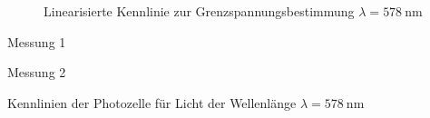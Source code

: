 \begin{figure}
	\centering
	
	\caption{Linearisierte Kennlinie zur Grenzspannungsbestimmung $\lambda = \SI{578}{\nano\metre}$}
	\label{fig:kennlinien_578nm}
\end{figure}
\begin{table}
	\centering
	\begin{subtable}{0.5\textwidth}
		\centering
		\vspace{0pt}
		\resizebox{0.95\columnwidth}{!}{%
			
		}
		\caption{Messung 1}
	\end{subtable}%
	\begin{subtable}{0.5\textwidth}
		\centering
		\vspace{0pt}
		\resizebox{0.95\columnwidth}{!}{%
			
		}
		\caption{Messung 2}
	\end{subtable}

	\caption{Kennlinien der Photozelle f\"ur Licht der Wellenl\"ange $\lambda = \SI{578}{\nano\metre}$}
\end{table}


